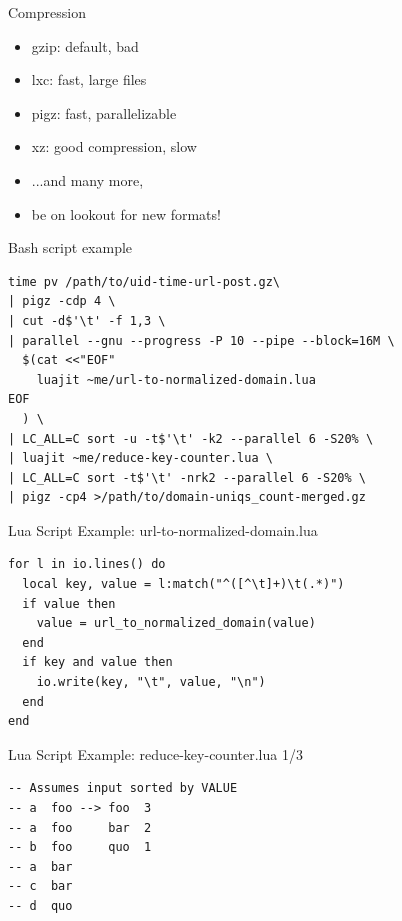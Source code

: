 \documentclass[handout]{beamer}
\begin{document}
\begin{frame}{Compression}

\begin{itemize}
\item gzip: default, bad
\item lxc: fast, large files
\item pigz: fast, parallelizable
\item xz: good compression, slow
\item ...and many more,
\item be on lookout for new formats!
\end{itemize}

\end{frame}


\begin{frame}[fragile]{Bash script example}

\begin{verbatim}
time pv /path/to/uid-time-url-post.gz\
| pigz -cdp 4 \
| cut -d$'\t' -f 1,3 \
| parallel --gnu --progress -P 10 --pipe --block=16M \
  $(cat <<"EOF"
    luajit ~me/url-to-normalized-domain.lua
EOF
  ) \
| LC_ALL=C sort -u -t$'\t' -k2 --parallel 6 -S20% \
| luajit ~me/reduce-key-counter.lua \
| LC_ALL=C sort -t$'\t' -nrk2 --parallel 6 -S20% \
| pigz -cp4 >/path/to/domain-uniqs_count-merged.gz
\end{verbatim}

\end{frame}


\begin{frame}[fragile]{Lua Script Example: url-to-normalized-domain.lua}

\begin{verbatim}
for l in io.lines() do
  local key, value = l:match("^([^\t]+)\t(.*)")
  if value then
    value = url_to_normalized_domain(value)
  end
  if key and value then
    io.write(key, "\t", value, "\n")
  end
end
\end{verbatim}

\end{frame}


\begin{frame}[fragile]{Lua Script Example: reduce-key-counter.lua 1/3}

\begin{verbatim}
-- Assumes input sorted by VALUE
-- a  foo --> foo  3
-- a  foo     bar  2
-- b  foo     quo  1
-- a  bar
-- c  bar
-- d  quo
\end{verbatim}

\end{frame}
\end{document}
